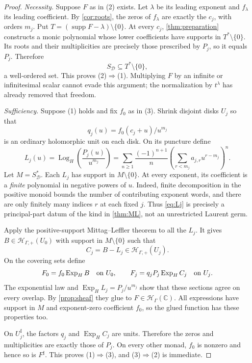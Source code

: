 \documentclass[11pt,letterpaper]{article}
\theoremstyle{definition}
\theoremstyle{remark}
\newcommand{\C}{\mathbb C}
\newcommand{\HH}{\mathscr H_\Gamma}
\newcommand{\HP}{\mathscr H_{\Gamma,+}}
\newcommand{\sh}{^{\sharp}}
\newcommand{\supp}{\operatorname{supp}}
\newcommand{\ExpH}{\operatorname{Exp}_{H}}
\newcommand{\LogH}{\operatorname{Log}_{H}}
\numberwithin{equation}{section}
\begin{document}
\begin{proof}
\textit{Necessity.} Suppose $F$ as in (2) exists. Let $\lambda$ be its leading exponent and $f_\lambda$ its leading coefficient. By \cref{cor:roots}, the zeros of $f_\lambda$ are exactly the $c_j$, with orders $m_j$. Put $T=(\supp F-\lambda)\setminus\{0\}$. At every $c_j$, \cref{thm:preparation} constructs a monic polynomial whose lower coefficients have supports in $T^*\setminus\{0\}$. Its roots and their multiplicities are precisely those prescribed by $P_j$, so it equals $P_j$. Therefore
\[
 S_{\mathcal D}\subseteq T^*\setminus\{0\},
\]
a well-ordered set. This proves (2)$\Rightarrow$(1). Multiplying $F$ by an infinite or infinitesimal scalar cannot evade this argument; the normalization by $t^\lambda$ has already removed that freedom.

\textit{Sufficiency.} Suppose (1) holds and fix $f_0$ as in (3). Shrink disjoint disks $U_j$ so that
\[
 q_j(u)=f_0(c_j+u)/u^{m_j}
\]
is an ordinary holomorphic unit on each disk. On its puncture define
\begin{equation}\label{eq:Lj}
 L_j(u)=\LogH\!\left(\frac{P_j(u)}{u^{m_j}}\right)
 =\sum_{n\ge1}\frac{(-1)^{n+1}}n
 \left(\sum_{r<m_j}a_{j,r}u^{r-m_j}\right)^n.
\end{equation}
Let $M=S_{\mathcal D}^*$. Each $L_j$ has support in $M\setminus\{0\}$. At every exponent, its coefficient is a \emph{finite} polynomial in negative powers of $u$. Indeed, finite decomposition in the positive monoid bounds the number of contributing exponent words, and there are only finitely many indices $r$ at each fixed $j$. Thus \eqref{eq:Lj} is precisely a principal-part datum of the kind in \cref{thm:ML}, not an unrestricted Laurent germ.

Apply the positive-support Mittag--Leffler theorem to all the $L_j$. It gives $B\in\HP(U_0)$ with support in $M\setminus\{0\}$ such that
\[
 C_j=B-L_j\in\HP(U_j).
\]
On the covering sets define
\begin{equation}\label{eq:Fglue}
 F_0=f_0\ExpH B\quad\hbox{on }U_0,
 \qquad
 F_j=q_jP_j\ExpH C_j\quad\hbox{on }U_j.
\end{equation}
The exponential law and $\ExpH L_j=P_j/u^{m_j}$ show that these sections agree on every overlap. By \cref{prop:sheaf} they glue to $F\in\HH(\C)$. All expressions have support in $M$ and exponent-zero coefficient $f_0$, so the glued function has these properties too.

On $U_j\sh$, the factors $q_j$ and $\ExpH C_j$ are units. Therefore the zeros and multiplicities are exactly those of $P_j$. On every other monad, $f_0$ is nonzero and hence so is $F\sh$. This proves (1)$\Rightarrow$(3), and (3)$\Rightarrow$(2) is immediate.
\end{proof}
\end{document}

